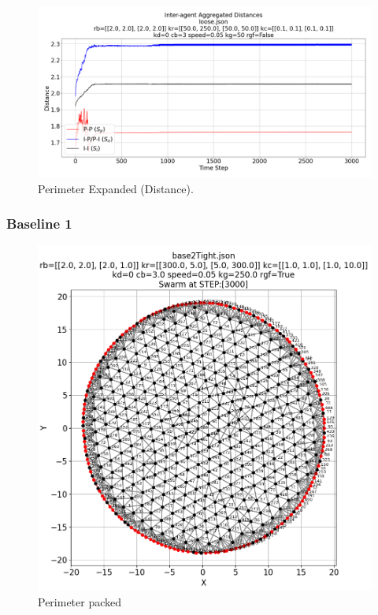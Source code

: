 \documentclass[12pt,a4paper]{IEEEtran}
\begin{document}
\begin{figure}[H]
	\begin{center}
		\includegraphics[width=1.0\linewidth]{figures/perimExpandDistance}
	\end{center}
	\caption{Perimeter Expanded (Distance). \label{fig:perimExpandDistance}}
\end{figure}

\subsubsection{Baseline 1}

\begin{figure}[H]
	\begin{center}
		\includegraphics[width=1.0\linewidth]{figures/baseline2Packed}
	\end{center}
	\caption{Perimeter packed\label{fig:perimPackedBaseline2}}
\end{figure}
\end{document}
